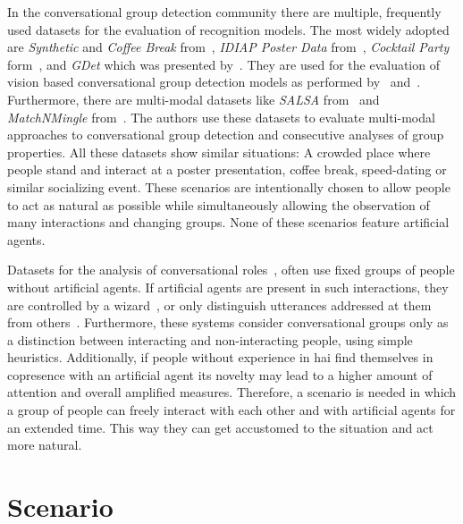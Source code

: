 In the \gls{conversational group} detection community there are multiple, frequently used datasets for the evaluation of recognition models.
The most widely adopted are \emph{Synthetic} and \emph{Coffee Break} from~, \emph{IDIAP Poster Data} from~, \emph{Cocktail Party} form~, and \emph{GDet} which was presented by~.
They are used for the evaluation of vision based \gls{conversational group} detection models as performed by~ and~.
Furthermore, there are multi-modal datasets like \emph{SALSA} from~ and \emph{MatchNMingle} from~.
The authors use these datasets to evaluate multi-modal approaches to \gls{conversational group} detection and consecutive analyses of group properties.
All these datasets show similar situations:
A crowded place where people stand and interact at a poster presentation, coffee break, speed-dating or similar socializing event.
These scenarios are intentionally chosen to allow people to act as natural as possible while simultaneously allowing the observation of many interactions and changing groups.
None of these scenarios feature \glspl{artificial agent}.

Datasets for the analysis of \glspl{conversational role}~\cite{Jovanovic2006,Akhtiamov2017,Makino2018}, often use fixed groups of people without \glspl{artificial agent}.
If \glspl{artificial agent} are present in such interactions, they are controlled by a \gls{wizard}~\cite{VanTurnhout2005,Jayagopi2013a}, or only distinguish utterances addressed at them from others~\cite{Bohus2011,Skantze2014}.
Furthermore, these systems consider \glspl{conversational group} only as a distinction between interacting and non-interacting people, using simple heuristics.
%
Additionally, if people without experience in \gls{hai} find themselves in \gls{copresence} with an \gls{artificial agent} its novelty may lead to a higher amount of attention and overall amplified measures.
Therefore, a scenario is needed in which a group of people can freely interact with each other and with \glspl{artificial agent} for an extended time.
This way they can get accustomed to the situation and act more natural.

\section{Scenario}

